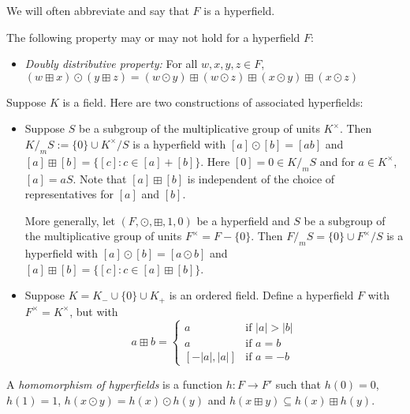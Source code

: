\documentclass[10pt, preprint]{article}
\theoremstyle{definition}
\begin{document}
We will often abbreviate and say that $F$ is a hyperfield.

The following property may or may not hold for a hyperfield $F$:
%
\begin{itemize}%
\item
\emph{Doubly distributive property:} For all $w,x,y,z \in F$,
$(w \boxplus x) \odot (y \boxplus z) = (w \odot y) \boxplus (w \odot
z) \boxplus (x \odot y) \boxplus (x \odot z)$
\end{itemize}

Suppose $K$ is a field. Here are two constructions of associated
hyperfields:
%
\begin{itemize}%
\item
Suppose $S$ be a subgroup of the multiplicative group of units
$K^{\times }$. Then $K/_{m} S := \{0\} \cup K^{\times }/S$ is a
hyperfield with $[a] \odot [b] = [ab]$ and $[a] \boxplus [b] = \{[c] :
c \in [a] + [b]\}$. Here $[0] = 0 \in K/_{m} S$ and for $a \in K^{
\times }$, $[a] = aS$. Note that $[a] \boxplus [b]$ is independent of
the choice of representatives for $[a]$ and $[b]$.

More generally, let $(F,\odot , \boxplus ,1,0)$ be a hyperfield and
$S$ be a subgroup of the multiplicative group of units $F^{\times }= F
- \{0\}$. Then $F/_{m} S = \{0\} \cup F^{\times }/S$ is a hyperfield
with $[a] \odot [b] = [a\odot b]$ and $[a] \boxplus [b] = \{[c] : c
\in [a] \boxplus [b]\}$.
%
\item
Suppose $K = K_{-} \cup \{0\} \cup K_{+}$ is an ordered field. Define
a hyperfield $F$ with $F^{\times }= K^{\times }$, but with
%
\begin{equation*}
a \boxplus b =
%
\begin{cases}
a
& \text{if } |a| > |b|
\\
a
&\text{if }a = b
\\
[-|a|,|a|]
&\text{if }a = -b
\end{cases}
%
\end{equation*}
%
\end{itemize}

A \emph{homomorphism of hyperfields} is a function $h : F \to F'$ such
that $h(0) = 0$, $h(1) = 1$, $h(x \odot y) = h(x) \odot h(y)$ and
$h(x \boxplus y) \subseteq h(x) \boxplus h(y)$.
\end{document}
